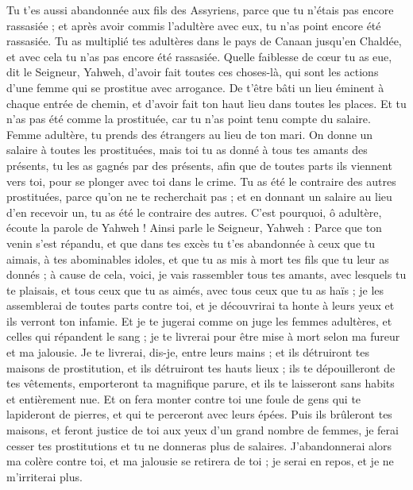 \begin{multicols}{2}
Tu t'es aussi abandonnée aux fils des Assyriens, parce que tu n'étais pas encore rassasiée ; et après avoir commis l'adultère avec eux, tu n'as point encore été rassasiée.
Tu as multiplié tes adultères dans le pays de Canaan jusqu'en Chaldée, et avec cela tu n'as pas encore été rassasiée.
Quelle faiblesse de cœur tu as eue, dit le Seigneur, Yahweh, d'avoir fait toutes ces choses-là, qui sont les actions d'une femme qui se prostitue avec arrogance.
De t'être bâti un lieu éminent à chaque entrée de chemin, et d'avoir fait ton haut lieu dans toutes les places. Et tu n'as pas été comme la prostituée, car tu n'as point tenu compte du salaire.
Femme adultère, tu prends des étrangers au lieu de ton mari.
On donne un salaire à toutes les prostituées, mais toi tu as donné à tous tes amants des présents, tu les as gagnés par des présents, afin que de toutes parts ils viennent vers toi, pour se plonger avec toi dans le crime.
Tu as été le contraire des autres prostituées, parce qu'on ne te recherchait pas ; et en donnant un salaire au lieu d'en recevoir un, tu as été le contraire des autres.
C'est pourquoi, ô adultère, écoute la parole de Yahweh !
Ainsi parle le Seigneur, Yahweh : Parce que ton venin s'est répandu, et que dans tes excès tu t'es abandonnée à ceux que tu aimais, à tes abominables idoles, et que tu as mis à mort tes fils que tu leur as donnés ;
à cause de cela, voici, je vais rassembler tous tes amants, avec lesquels tu te plaisais, et tous ceux que tu as aimés, avec tous ceux que tu as haïs ; je les assemblerai de toutes parts contre toi, et je découvrirai ta honte à leurs yeux et ils verront ton infamie.
Et je te jugerai comme on juge les femmes adultères, et celles qui répandent le sang ; je te livrerai pour être mise à mort selon ma fureur et ma jalousie.
Je te livrerai, dis-je, entre leurs mains ; et ils détruiront tes maisons de prostitution, et ils détruiront tes hauts lieux ; ils te dépouilleront de tes vêtements, emporteront ta magnifique parure, et ils te laisseront sans habits et entièrement nue.
Et on fera monter contre toi une foule de gens qui te lapideront de pierres, et qui te perceront avec leurs épées.
Puis ils brûleront tes maisons, et feront justice de toi aux yeux d'un grand nombre de femmes, je ferai cesser tes prostitutions et tu ne donneras plus de salaires.
J'abandonnerai alors ma colère contre toi, et ma jalousie se retirera de toi ; je serai en repos, et je ne m'irriterai plus.

\end{multicols}
